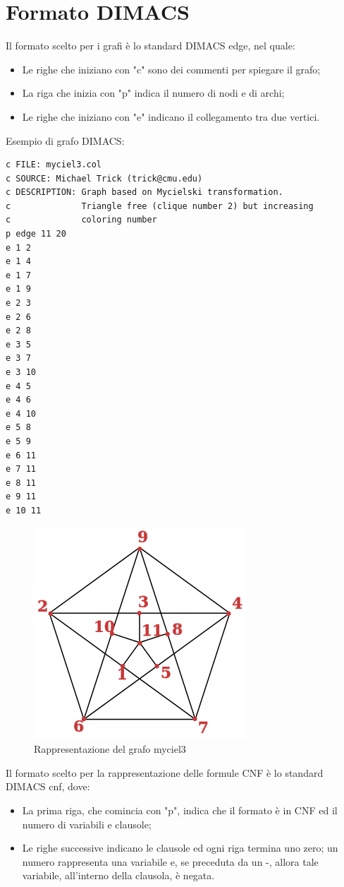 \documentclass[a4paper,11pt]{article} %
\begin{document}
\section{Formato DIMACS}
Il formato scelto per i grafi è lo standard DIMACS edge, nel quale:
\begin{itemize}
	\item Le righe che iniziano con "c" sono dei commenti per spiegare il grafo;
	\item La riga che inizia con "p" indica il numero di nodi e di archi;
	\item Le righe che iniziano con "e" indicano il collegamento tra due vertici.
\end{itemize}
Esempio di grafo DIMACS:\\
\begin{verbatim}
c FILE: myciel3.col
c SOURCE: Michael Trick (trick@cmu.edu)
c DESCRIPTION: Graph based on Mycielski transformation. 
c              Triangle free (clique number 2) but increasing
c              coloring number
p edge 11 20
e 1 2
e 1 4
e 1 7
e 1 9
e 2 3
e 2 6
e 2 8
e 3 5
e 3 7
e 3 10
e 4 5
e 4 6
e 4 10
e 5 8
e 5 9
e 6 11
e 7 11
e 8 11
e 9 11
e 10 11
\end{verbatim}
\begin{figure}
	\centering
	\includegraphics[scale=0.5]{myciel.jpg}
	\caption{Rappresentazione del grafo myciel3}
\end{figure}
Il formato scelto per la rappresentazione delle formule CNF è lo standard DIMACS cnf, dove:
\begin{itemize}
	\item La prima riga, che comincia con "p", indica che il formato è in CNF ed il numero di variabili e clausole;
	\item Le righe successive indicano le clausole ed ogni riga termina uno zero; un numero rappresenta una variabile e, se preceduta da un -, allora tale variabile, all'interno della clausola, è negata.
\end{itemize}
\end{document}
